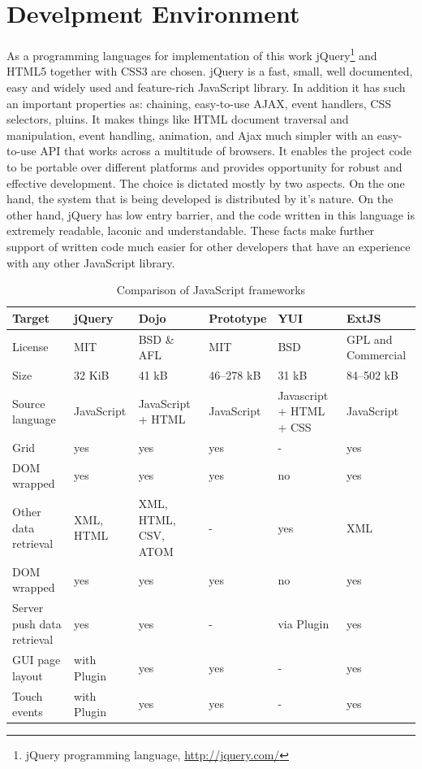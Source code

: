 \section{Develpment Environment}
	As a programming languages for implementation of this work jQuery\footnote{jQuery programming language, \url{http://jquery.com/}} and HTML5 together with CSS3 are chosen. jQuery is a fast, small, well documented, easy and widely used and feature-rich JavaScript library. In addition it has such an important properties as: chaining, easy-to-use AJAX, event handlers, CSS selectors, pluins. It makes things like HTML document traversal and manipulation, event handling, animation, and Ajax much simpler with an easy-to-use API that works across a multitude of browsers. It enables the project code to be portable over different platforms and provides opportunity for robust and effective development. The choice is dictated mostly by two aspects. On the one hand, the system that is being developed is distributed by it’s nature. On the other hand, jQuery has low entry barrier, and the code written in this language is extremely readable, laconic and understandable. These facts make further support of written code much easier for other developers that have an experience with any other JavaScript library.
	\newline
	\begin{table}[H]
	\centering
	\begin{tabular}{|L{3cm}|l|L{2cm}|l|L{2cm}|L{2cm}|}
	\hline
	Target 			& jQuery & Dojo & Prototype & YUI & ExtJS \\
	\hline
	\hline
	License		& MIT & BSD \& AFL & MIT & BSD & GPL and Commercial \\
	\hline
	Size		& 32 KiB & 41 kB & 46–278 kB & 31 kB & 84–502 kB \\
	\hline
	Source language		& JavaScript & JavaScript + HTML & JavaScript &  Javascript + HTML + CSS & JavaScript \\
	\hline
	Grid		& yes & yes & yes & - & yes  \\
	\hline
	DOM wrapped		& yes & yes & yes & no & yes \\
	\hline
	Other data retrieval		& XML, HTML & XML, HTML, CSV, ATOM & - & yes & XML  \\
	\hline
	DOM wrapped		& yes & yes & yes & no & yes \\
	\hline
	Server push data retrieval		& yes & yes & - & via Plugin & yes \\
	\hline
	GUI page layout		& with Plugin & yes & yes & - & yes \\
	\hline 		
	Touch events		& with Plugin & yes & yes & - & yes \\
	\hline 
	\end{tabular}
	\caption[Caption in TOC]{Comparison of JavaScript frameworks}
	\label{tab:JS_frameworks}
	\end{table}
